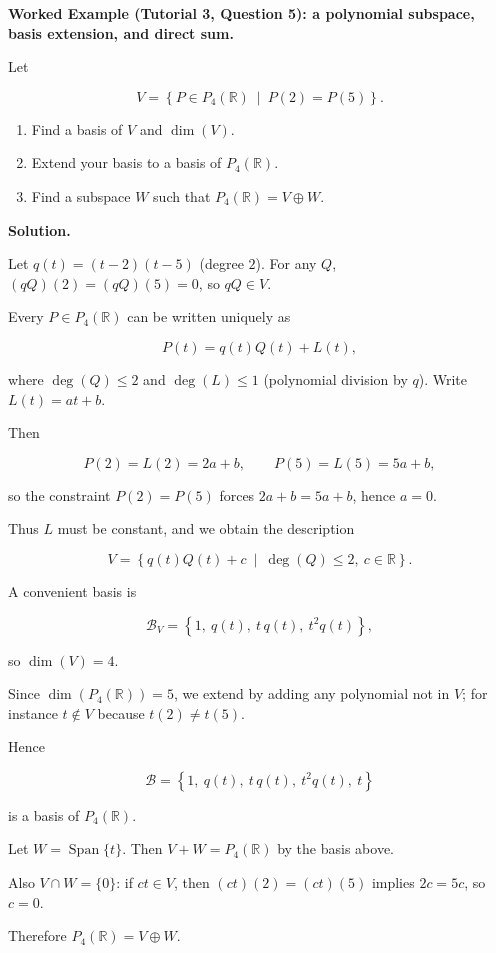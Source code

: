 \begin{examplebox}

\textbf{Worked Example (Tutorial 3, Question 5): a polynomial subspace, basis extension, and direct sum.}

Let

\[
V=\left\{P\in P_4(\mathbb{R})\ \middle|\ P(2)=P(5)\right\}.
\]

\begin{enumerate}

\item Find a basis of $V$ and $\dim(V)$.

\item Extend your basis to a basis of $P_4(\mathbb{R})$.

\item Find a subspace $W$ such that $P_4(\mathbb{R})=V\oplus W$.

\end{enumerate}

\medskip

\textbf{Solution.}

Let $q(t)=(t-2)(t-5)$ (degree $2$). For any $Q$, $(qQ)(2)=(qQ)(5)=0$, so $qQ\in V$.

Every $P\in P_4(\mathbb{R})$ can be written uniquely as

\[
P(t)=q(t)Q(t)+L(t),
\]

where $\deg(Q)\le 2$ and $\deg(L)\le 1$ (polynomial division by $q$). Write $L(t)=at+b$.

Then

\[
P(2)=L(2)=2a+b,\qquad P(5)=L(5)=5a+b,
\]

so the constraint $P(2)=P(5)$ forces $2a+b=5a+b$, hence $a=0$.

Thus $L$ must be constant, and we obtain the description

\[
V=\left\{q(t)Q(t)+c \ \middle|\ \deg(Q)\le 2,\ c\in\mathbb{R}\right\}.
\]

A convenient basis is

\[
\mathcal{B}_V=\left\{1,\ q(t),\ t\,q(t),\ t^2 q(t)\right\},
\]

so $\dim(V)=4$.

Since $\dim(P_4(\mathbb{R}))=5$, we extend by adding any polynomial not in $V$; for instance $t\notin V$ because $t(2)\neq t(5)$.

Hence

\[
\mathcal{B}=\left\{1,\ q(t),\ t\,q(t),\ t^2 q(t),\ t\right\}
\]

is a basis of $P_4(\mathbb{R})$.

Let $W=\operatorname{Span}\{t\}$. Then $V+W=P_4(\mathbb{R})$ by the basis above.

Also $V\cap W=\{0\}$: if $ct\in V$, then $(ct)(2)=(ct)(5)$ implies $2c=5c$, so $c=0$.

Therefore $P_4(\mathbb{R})=V\oplus W$.

\end{examplebox}

